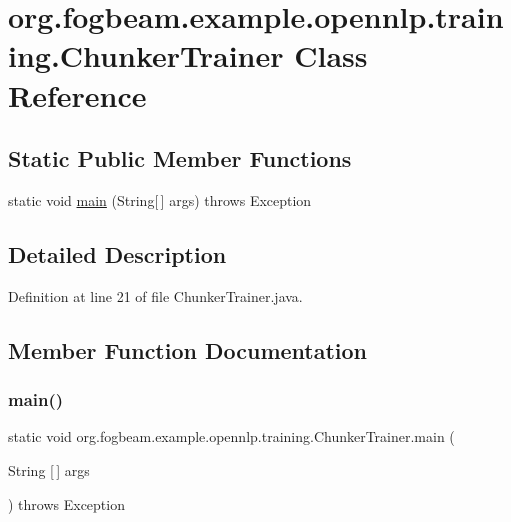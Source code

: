 \hypertarget{classorg_1_1fogbeam_1_1example_1_1opennlp_1_1training_1_1_chunker_trainer}{}\section{org.\+fogbeam.\+example.\+opennlp.\+training.\+Chunker\+Trainer Class Reference}
\label{classorg_1_1fogbeam_1_1example_1_1opennlp_1_1training_1_1_chunker_trainer}
\subsection*{Static Public Member Functions}
\begin{DoxyCompactItemize}
\item 
static void \hyperlink{classorg_1_1fogbeam_1_1example_1_1opennlp_1_1training_1_1_chunker_trainer_afe3aca3ce6d44e121520a6db250b331c}{main} (String\mbox{[}$\,$\mbox{]} args)  throws Exception 	
\end{DoxyCompactItemize}


\subsection{Detailed Description}


Definition at line 21 of file Chunker\+Trainer.\+java.



\subsection{Member Function Documentation}
\hypertarget{classorg_1_1fogbeam_1_1example_1_1opennlp_1_1training_1_1_chunker_trainer_afe3aca3ce6d44e121520a6db250b331c}{}\label{classorg_1_1fogbeam_1_1example_1_1opennlp_1_1training_1_1_chunker_trainer_afe3aca3ce6d44e121520a6db250b331c} 
\subsubsection{\texorpdfstring{main()}{main()}}
{\footnotesize\ttfamily static void org.\+fogbeam.\+example.\+opennlp.\+training.\+Chunker\+Trainer.\+main (\begin{DoxyParamCaption}\item[{String \mbox{[}$\,$\mbox{]}}]{args }\end{DoxyParamCaption}) throws Exception\hspace{0.3cm}{\ttfamily [static]}}



